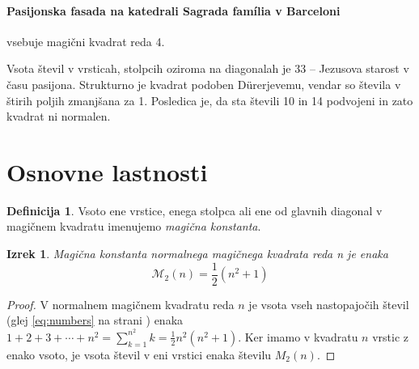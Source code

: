 \documentclass[a4paper,12pt]{article}
\theoremstyle{definition}
\newtheorem{definicija}{Definicija}
\theoremstyle{plain}
\newtheorem{izrek}{Izrek}
\begin{document}
\paragraph{Pasijonska fasada na katedrali Sagrada família v Barceloni}
vsebuje magični kvadrat reda 4.

Vsota števil v vrsticah, stolpcih oziroma na diagonalah je 33 -- Jezusova starost
v času pasijona. Strukturno je kvadrat podoben Dürerjevemu, vendar so števila
v štirih poljih zmanjšana za 1. Posledica je, da sta števili 10 in 14 podvojeni
in zato kvadrat ni normalen.


\section{Osnovne lastnosti}

     
     \begin{definicija}
       Vsoto ene vrstice, enega stolpca ali ene od glavnih diagonal
       v magičnem kvadratu imenujemo \emph{magična konstanta}.
     \end{definicija}

  
  \begin{izrek}
    Magična konstanta normalnega magičnega kvadrata reda n
    je enaka
    \begin{equation}
       \mathcal{M}_2(n)=\frac{1}{2}(n^2+1)
       \label{eq:mc}
    \end{equation}
  \end{izrek}

   
   \begin{proof}
      V normalnem magičnem kvadratu reda \(n\) je vsota vseh nastopajočih
      števil (glej \eqref{eq:numbers} na strani \pageref{eq:numbers}) enaka \(1+2+3+\cdots+n^2=\sum_{k=1}^{n^2}k=\frac{1}{2}n^2(n^2+1)\). Ker imamo
      v kvadratu \(n\) vrstic z enako vsoto, je vsota števil v eni vrstici
      enaka številu \(M_2(n)\). %
     
   \end{proof}
\end{document}
